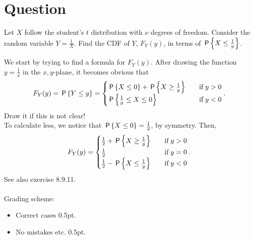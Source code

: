 \section*{Question}
\begin{exercise}[1]
Let $X$ follow the student's $t$ distribution with $\nu$ degrees of freedom. Consider the random variable $Y = \frac{1}{X}$. Find the CDF of $Y$, $F_Y(y)$, in terms of $\P{X\leq\frac{1}{y}}$.
\begin{solution}
We start by trying to find a formula for $F_Y(y)$. After drawing the function $y=\frac{1}{x}$ in the $x,y$-plane, it becomes obvious that
\begin{align*}
    F_Y(y) = \P{Y\leq y} = \begin{cases}
    \P{X\leq 0} + \P{X\geq\frac{1}{y}}&\quad\text{if}\;y>0\\
    \P{\frac{1}{y}\leq X\leq 0}&\quad\text{if}\;y<0
    \end{cases}.
\end{align*}
Draw it if this is not clear!\\
To calculate less, we notice that $\P{X\leq 0}=\frac12$, by symmetry. Then,
\begin{align*}
    F_Y(y) = \begin{cases}
    \frac12 + \P{X\geq\frac{1}{y}}&\quad\text{if}\;y>0\\
    \frac12&\quad\text{if}\;y=0\\
    \frac12 - \P{X\leq\frac1y}&\quad\text{if}\;y<0
    \end{cases}.
\end{align*}
See also exercise 8.9.11.
\\\\
Grading scheme:
\begin{itemize}
    \item Correct cases 0.5pt.
    \item No mistakes etc. 0.5pt.
\end{itemize}
\end{solution}
\end{exercise}


